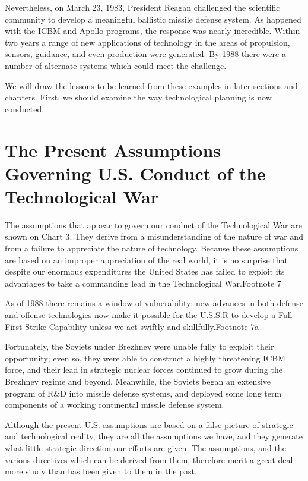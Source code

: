 Nevertheless, on March 23, 1983, President Reagan challenged the scientific community to develop a meaningful ballistic missile defense system. As happened with the ICBM and Apollo programs, the response was nearly incredible. Within two years a range of new applications of technology in the areas of propulsion, sensors, guidance, and even production were generated. By 1988 there were a number of alternate systems which could meet the challenge.

We will draw the lessons to be learned from these examples in later sections and chapters. First, we should examine the way technological planning is now conducted.

\section[Present U.S. Assumptions of the Tech. War]
{The Present Assumptions Governing U.S. Conduct of the Technological War}

The assumptions that appear to govern our conduct of the Technological War are shown on Chart 3. They derive from a misunderstanding of the nature of war and from a failure to appreciate the nature of technology. Because these assumptions are based on an improper appreciation of the real world, it is no surprise that despite our enormous expenditures the United States has failed to exploit its advantages to take a commanding lead in the Technological War.Footnote 7

As of 1988 there remains a window of vulnerability: new advances in both defense and offense technologies now make it possible for the U.S.S.R to develop a Full First-Strike Capability unless we act swiftly and skillfully.Footnote 7a

Fortunately, the Soviets under Brezhnev were unable fully to exploit their opportunity; even so, they were able to construct a highly threatening ICBM force, and their lead in strategic nuclear forces continued to grow during the Brezhnev regime and beyond. Meanwhile, the Soviets began an extensive program of R\&D into missile defense systems, and deployed some long term components of a working continental missile defense system.

Although the present U.S. assumptions are based on a false picture of strategic and technological reality, they are all the assumptions we have, and they generate what little strategic direction our efforts are given. The assumptions, and the various directives which can be derived from them, therefore merit a great deal more study than has been given to them in the past.

